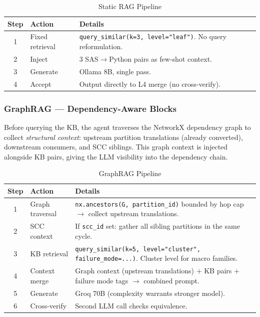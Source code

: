\documentclass[11pt,a4paper]{article}
\begin{document}
\begin{table}[H]
\centering
\caption{Static RAG Pipeline}
\renewcommand{\arraystretch}{1.3}
\small
\begin{tabularx}{\textwidth}{@{} c l X @{}}
\toprule
\textbf{Step} & \textbf{Action} & \textbf{Details} \\
\midrule
1 & Fixed retrieval & \texttt{query\_similar(k=3, level="leaf")}. No query reformulation. \\
2 & Inject & 3 SAS$\to$Python pairs as few-shot context. \\
3 & Generate & Ollama 8B, single pass. \\
4 & Accept & Output directly to L4 merge (no cross-verify). \\
\bottomrule
\end{tabularx}
\end{table}

\subsubsection{GraphRAG — Dependency-Aware Blocks}

\begin{infobox}
Before querying the KB, the agent traverses the NetworkX dependency graph to collect \emph{structural context}: upstream partition translations (already converted), downstream consumers, and SCC siblings. This graph context is injected alongside KB pairs, giving the LLM visibility into the dependency chain.
\end{infobox}

\begin{table}[H]
\centering
\caption{GraphRAG Pipeline}
\renewcommand{\arraystretch}{1.3}
\small
\begin{tabularx}{\textwidth}{@{} c l X @{}}
\toprule
\textbf{Step} & \textbf{Action} & \textbf{Details} \\
\midrule
1 & Graph traversal & \texttt{nx.ancestors(G, partition\_id)} bounded by hop cap $\to$ collect upstream translations. \\
2 & SCC context & If \texttt{scc\_id} set: gather all sibling partitions in the same cycle. \\
3 & KB retrieval & \texttt{query\_similar(k=5, level="cluster", failure\_mode=...)}. Cluster level for macro families. \\
4 & Context merge & Graph context (upstream translations) $+$ KB pairs $+$ failure mode tags $\to$ combined prompt. \\
5 & Generate & Groq 70B (complexity warrants stronger model). \\
6 & Cross-verify & Second LLM call checks equivalence. \\
\bottomrule
\end{tabularx}
\end{table}
\end{document}
